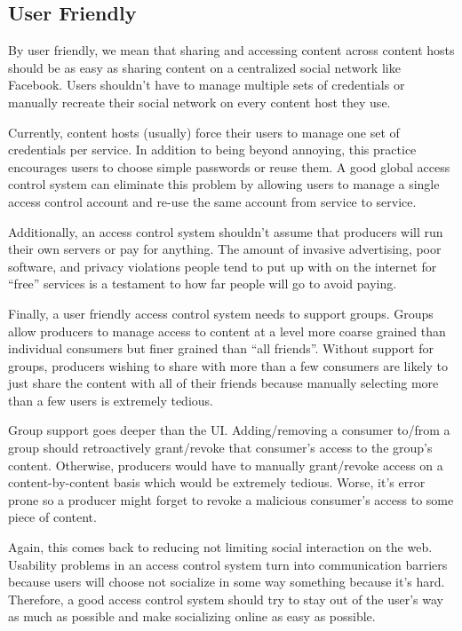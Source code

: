 \documentclass[pdftex,12pt,a4papaer,twoside,notitlepage]{report}
\begin{document}
\subsection{User Friendly}
\label{sec:goal-user}

By user friendly, we mean that sharing and accessing content across content
hosts should be as easy as sharing content on a centralized social network like
Facebook. Users shouldn't have to manage multiple sets of credentials or
manually recreate their social network on every content host they use.

Currently, content hosts (usually) force their users to manage one set of
credentials per service. In addition to being beyond annoying, this practice
encourages users to choose simple passwords or reuse them. A good global access
control system can eliminate this problem by allowing users to manage a single
access control account and re-use the same account from service to service.

Additionally, an access control system shouldn't assume that producers will run
their own servers or pay for anything. The amount of invasive advertising, poor
software, and privacy violations people tend to put up with on the internet for
``free'' services is a testament to how far people will go to avoid paying.

Finally, a user friendly access control system needs to support groups. Groups
allow producers to manage access to content at a level more coarse grained than
individual consumers but finer grained than ``all friends''. Without support for
groups, producers wishing to share with more than a few consumers are likely to
just share the content with all of their friends because manually selecting more
than a few users is extremely tedious.

Group support goes deeper than the UI. Adding/removing a consumer to/from a
group should retroactively grant/revoke that consumer's access to the group's
content. Otherwise, producers would have to manually grant/revoke access on a
content-by-content basis which would be extremely tedious. Worse, it's error
prone so a producer might forget to revoke a malicious consumer's access to some
piece of content.

Again, this comes back to reducing not limiting social interaction on the web.
Usability problems in an access control system turn into communication barriers
because users will choose not socialize in some way something because it's hard.
Therefore, a good access control system should try to stay out of the user's way
as much as possible and make socializing online as easy as possible.
\end{document}
